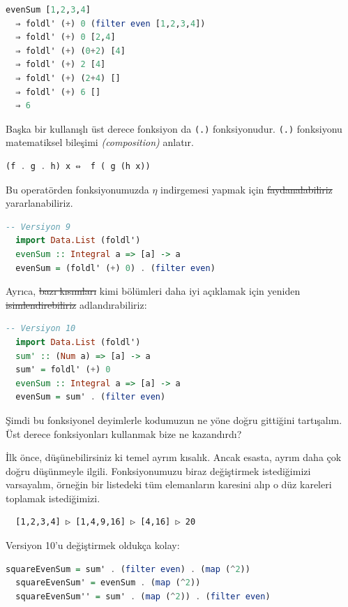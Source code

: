 \documentclass[a4paper,14pt,openany]{extbook} %
\let\emph\textit
\begin{document}
\begin{lstlisting}[language=Haskell]
  evenSum [1,2,3,4]
  ⇒ foldl' (+) 0 (filter even [1,2,3,4])
  ⇒ foldl' (+) 0 [2,4]
  ⇒ foldl' (+) (0+2) [4]
  ⇒ foldl' (+) 2 [4]
  ⇒ foldl' (+) (2+4) []
  ⇒ foldl' (+) 6 []
  ⇒ 6
\end{lstlisting}

Başka bir kullanışlı üst derece fonksiyon da \lstinline!(.)!
fonksiyonudur. \lstinline!(.)! fonksiyonu matematiksel bileşimi
\emph{(composition)} anlatır.

\begin{lstlisting}[language=Haskell]
  (f . g . h) x ⇔  f ( g (h x))
\end{lstlisting}

Bu operatörden fonksiyonumuzda $η$ indirgemesi yapmak için
\st{faydanalabiliriz} yararlanabiliriz.

\begin{lstlisting}[language=Haskell]
  -- Versiyon 9
  import Data.List (foldl')
  evenSum :: Integral a => [a] -> a
  evenSum = (foldl' (+) 0) . (filter even)
\end{lstlisting}

Ayrıca, \st{bazı kısımları} kimi bölümleri daha iyi açıklamak için yeniden
\st{isimlendirebiliriz} adlandırabiliriz:

\begin{lstlisting}[language=Haskell]
  -- Versiyon 10
  import Data.List (foldl')
  sum' :: (Num a) => [a] -> a
  sum' = foldl' (+) 0
  evenSum :: Integral a => [a] -> a
  evenSum = sum' . (filter even)
\end{lstlisting}

Şimdi bu fonksiyonel deyimlerle kodumuzun ne yöne doğru gittiğini
tartışalım. Üst derece fonksiyonları kullanmak bize ne kazandırdı?

İlk önce, düşünebilirsiniz ki temel ayrım kısalık. Ancak esasta, ayrım daha
çok doğru düşünmeyle ilgili. Fonksiyonumuzu biraz değiştirmek
istediğimizi varsayalım, örneğin bir listedeki tüm elemanların karesini
alıp o düz kareleri toplamak istediğimizi.

\begin{lstlisting}
  [1,2,3,4] ▷ [1,4,9,16] ▷ [4,16] ▷ 20
\end{lstlisting}

Versiyon 10'u değiştirmek oldukça kolay:

\begin{lstlisting}[language=Haskell]
  squareEvenSum = sum' . (filter even) . (map (^2))
  squareEvenSum' = evenSum . (map (^2))
  squareEvenSum'' = sum' . (map (^2)) . (filter even)
\end{lstlisting}
\end{document}
